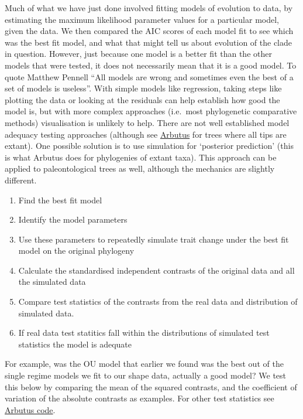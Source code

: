 \documentclass[]{article}
\providecommand{\tightlist}{%
  \setlength{\itemsep}{0pt}\setlength{\parskip}{0pt}}
\begin{document}
Much of what we have just done involved fitting models of evolution to
data, by estimating the maximum likelihood parameter values for a
particular model, given the data. We then compared the AIC scores of
each model fit to see which was the best fit model, and what that might
tell us about evolution of the clade in question. However, just because
one model is a better fit than the other models that were tested, it
does not necessarily mean that it is a good model. To quote Matthew
Pennell ``All models are wrong and sometimes even the best of a set of
models is useless''. With simple models like regression, taking steps
like plotting the data or looking at the residuals can help establish
how good the model is, but with more complex approaches (i.e.~most
phylogenetic comparative methods) visualisation is unlikely to help.
There are not well established model adequacy testing approaches
(although see
\href{https://www.journals.uchicago.edu/doi/10.1086/682022}{Arbutus} for
trees where all tips are extant). One possible solution is to use
simulation for `posterior prediction' (this is what Arbutus does for
phylogenies of extant taxa). This approach can be applied to
paleontological trees as well, although the mechanics are slightly
different.

\begin{enumerate}
\def\labelenumi{\arabic{enumi})}
\tightlist
\item
  Find the best fit model
\item
  Identify the model parameters
\item
  Use these parameters to repeatedly simulate trait change under the
  best fit model on the original phylogeny
\item
  Calculate the standardised independent contrasts of the original data
  and all the simulated data
\item
  Compare test statistics of the contrasts from the real data and
  distribution of simulated data.
\item
  If real data test statitics fall within the distributions of simulated
  test statistics the model is adequate
\end{enumerate}

For example, was the OU model that earlier we found was the best out of
the single regime models we fit to our shape data, actually a good
model? We test this below by comparing the mean of the squared
contrasts, and the coefficient of variation of the absolute contrasts as
examples. For other test statistics see
\href{https://github.com/mwpennell/arbutus/blob/master/R/summary-stats.R}{Arbutus
code}.
\end{document}
